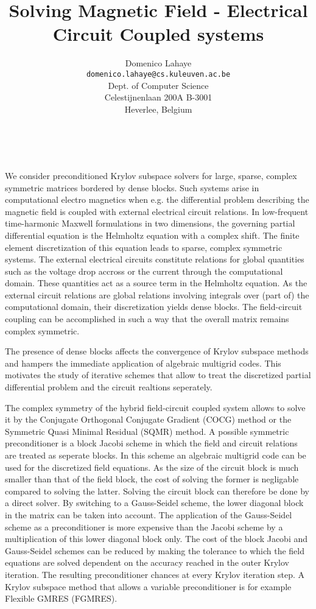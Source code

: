 \documentclass{article}
\date{ ~ \hspace{-4mm}}
\title{Solving Magnetic Field - Electrical Circuit Coupled systems   }
\author{Domenico Lahaye \\ {\tt  domenico.lahaye@cs.kuleuven.ac.be} \\ Dept. of Computer Science \\ Celestijnenlaan 200A B-3001 \\ Heverlee, Belgium}
\begin{document}
\maketitle
\thispagestyle{empty}





 




We consider preconditioned Krylov subspace solvers for large, 
sparse, complex symmetric matrices bordered by dense blocks. Such systems 
arise in computational electro magnetics when e.g. the differential problem 
describing the magnetic field is coupled with external electrical circuit 
relations. In low-frequent time-harmonic Maxwell formulations in two 
dimensions, the governing partial differential equation is the Helmholtz 
equation with a complex shift. The finite element discretization of this 
equation leads to sparse, complex symmetric systems. The external electrical 
circuits constitute relations for global quantities such as the voltage drop 
accross or the current through the computational domain. These quantities act 
as a source term in the Helmholtz equation. As the external circuit relations 
are global relations involving integrals over (part of) the computational 
domain, their discretization yields dense blocks. The field-circuit coupling 
can be accomplished in such a way that the overall matrix remains complex 
symmetric. 



 

The presence of dense blocks affects the convergence of Krylov subspace 
methods and hampers the immediate application of algebraic multigrid codes. 
This motivates the study of iterative schemes that allow to treat the 
discretized partial differential problem and the circuit realtions seperately. 



 

The complex symmetry of the hybrid field-circuit coupled system allows to 
solve it by the Conjugate Orthogonal Conjugate Gradient (COCG) method or the 
Symmetric Quasi Minimal Residual (SQMR) method. A possible symmetric 
preconditioner
is a block Jacobi scheme in which the field and circuit relations are treated 
as seperate blocks. In this scheme an algebraic multigrid code can be used 
for the discretized field equations. As the size of the circuit block is much 
smaller than that of the field block, the cost of solving the former is 
negligable compared to solving the latter. Solving the circuit block can 
therefore be done by a direct solver. By switching to a Gauss-Seidel scheme, 
the lower diagonal block in the matrix can be taken into account. The 
application of the Gauss-Seidel scheme as a preconditioner is more expensive 
than the Jacobi scheme by a multiplication of this lower diagonal block only. 
The cost of the block Jacobi and Gauss-Seidel schemes can be reduced by making 
the tolerance to which the field equations are solved dependent on the 
accuracy reached in the outer Krylov iteration. The resulting preconditioner
chances at every Krylov iteration step. A Krylov subspace method that
allows a variable preconditioner is for example Flexible GMRES
(FGMRES). 
\end{document}
